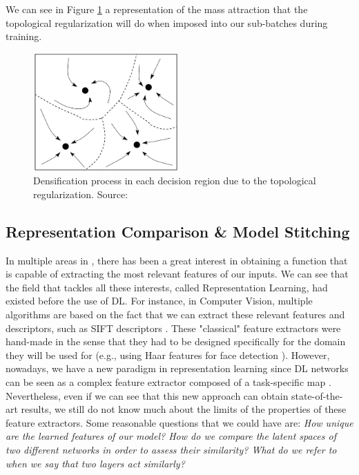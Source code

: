 \documentclass[../main.tex]{subfiles}
\begin{document}
We can see in Figure \ref{fig:attrac} a representation of the mass attraction that the topological regularization will do when imposed into our sub-batches during training.

\begin{figure}[!ht]
    \centering
    \includegraphics[width=0.5\textwidth]{figures/bg/atractor.png} 
    \caption{Densification process in each decision region due to the topological regularization. Source: \cite{torres_hopfield_2019}}
    \label{fig:attrac}
\end{figure}

\subsection{Representation Comparison \& Model Stitching}
\label{sec:repLearn}

In multiple areas in , there has been a great interest in obtaining a function that is capable of extracting the most relevant features of our inputs. We can see that the field that tackles all these interests, called Representation Learning, had existed before the use of DL. For instance, in Computer Vision, multiple algorithms are based on the fact that we can extract these relevant features and descriptors, such as SIFT descriptors \cite{gonzalez_digital_2002}. These "classical" feature extractors were hand-made in the sense that they had to be designed specifically for the domain they will be used for (e.g., using Haar features for face detection \cite{viola_rapid_2001}). However, nowadays, we have a new paradigm in representation learning since DL networks can be seen as a complex feature extractor composed of a task-specific map \cite{moschella_relative_2022}. Nevertheless, even if we can see that this new approach can obtain state-of-the-art results, we still do not know much about the limits of the properties of these feature extractors. Some reasonable questions that we could have are: \textit{How unique are the learned features of our model? How do we compare the latent spaces of two different networks in order to assess their similarity? What do we refer to when we say that two layers act similarly?}
\end{document}
